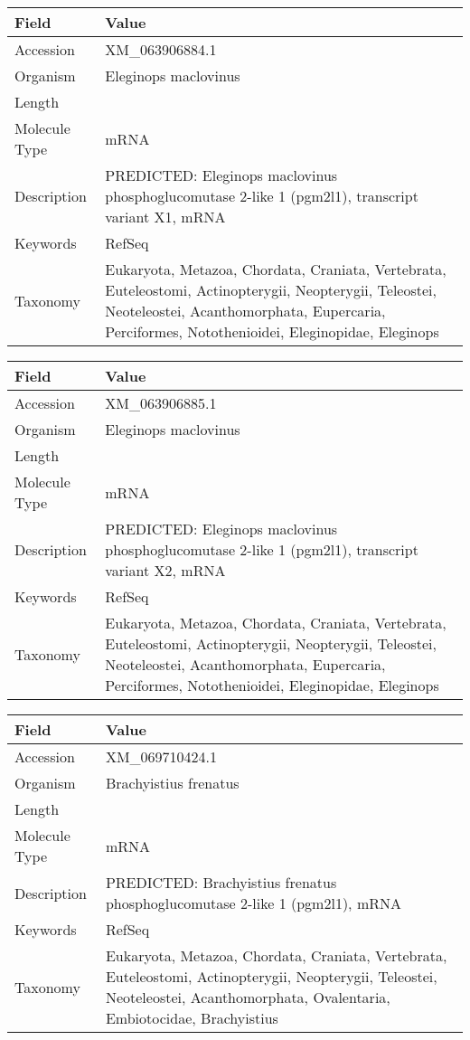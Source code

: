 \documentclass[10pt]{article}
\begin{document}
{\footnotesize
\begin{longtable}{>{\raggedright\arraybackslash}p{4.5cm} >{\raggedright\arraybackslash}p{11.5cm}}
\textbf{Field} & \textbf{Value} \\
\hline
Accession & XM\_063906884.1 \\
Organism & Eleginops maclovinus \\
Length & 3012 \\
Molecule Type & mRNA \\
Description & PREDICTED: Eleginops maclovinus phosphoglucomutase 2-like 1 (pgm2l1), transcript variant X1, mRNA \\
Keywords & RefSeq \\
Taxonomy & Eukaryota, Metazoa, Chordata, Craniata, Vertebrata, Euteleostomi, Actinopterygii, Neopterygii, Teleostei, Neoteleostei, Acanthomorphata, Eupercaria, Perciformes, Notothenioidei, Eleginopidae, Eleginops \\
\end{longtable}
}

{\footnotesize
\begin{longtable}{>{\raggedright\arraybackslash}p{4.5cm} >{\raggedright\arraybackslash}p{11.5cm}}
\textbf{Field} & \textbf{Value} \\
\hline
Accession & XM\_063906885.1 \\
Organism & Eleginops maclovinus \\
Length & 2883 \\
Molecule Type & mRNA \\
Description & PREDICTED: Eleginops maclovinus phosphoglucomutase 2-like 1 (pgm2l1), transcript variant X2, mRNA \\
Keywords & RefSeq \\
Taxonomy & Eukaryota, Metazoa, Chordata, Craniata, Vertebrata, Euteleostomi, Actinopterygii, Neopterygii, Teleostei, Neoteleostei, Acanthomorphata, Eupercaria, Perciformes, Notothenioidei, Eleginopidae, Eleginops \\
\end{longtable}
}

{\footnotesize
\begin{longtable}{>{\raggedright\arraybackslash}p{4.5cm} >{\raggedright\arraybackslash}p{11.5cm}}
\textbf{Field} & \textbf{Value} \\
\hline
Accession & XM\_069710424.1 \\
Organism & Brachyistius frenatus \\
Length & 2823 \\
Molecule Type & mRNA \\
Description & PREDICTED: Brachyistius frenatus phosphoglucomutase 2-like 1 (pgm2l1), mRNA \\
Keywords & RefSeq \\
Taxonomy & Eukaryota, Metazoa, Chordata, Craniata, Vertebrata, Euteleostomi, Actinopterygii, Neopterygii, Teleostei, Neoteleostei, Acanthomorphata, Ovalentaria, Embiotocidae, Brachyistius \\
\end{longtable}
}
\end{document}
